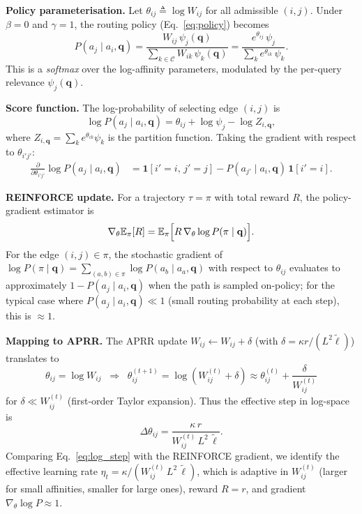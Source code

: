 \documentclass[journal,twocolumn,letterpaper]{IEEEtran}
\newcommand{\APRR}{\textsc{APRR}}
\newcommand{\EE}{\mathbb{E}}
\newcommand{\defeq}{\triangleq}
\begin{document}
\medskip
\noindent\textbf{Policy parameterisation.}
Let $\theta_{ij}\defeq\log W_{ij}$ for all admissible $(i,j)$.
Under $\beta=0$ and $\gamma=1$, the routing policy
(Eq.~\eqref{eq:policy}) becomes
\begin{equation}
  P(a_j\mid a_i,\mathbf{q})
  = \frac{W_{ij}\,\psi_j(\mathbf{q})}
         {\sum_{k\in\mathcal{C}}W_{ik}\,\psi_k(\mathbf{q})}
  = \frac{e^{\theta_{ij}}\,\psi_j}
         {\sum_k e^{\theta_{ik}}\,\psi_k}.
\label{eq:softmax}
\end{equation}
This is a \emph{softmax} over the log-affinity parameters, modulated by the
per-query relevance $\psi_j(\mathbf{q})$.

\medskip
\noindent\textbf{Score function.}
The log-probability of selecting edge $(i,j)$ is
\begin{equation}
  \log P(a_j\mid a_i,\mathbf{q})
  = \theta_{ij} + \log\psi_j - \log Z_{i,\mathbf{q}},
\end{equation}
where $Z_{i,\mathbf{q}}=\sum_k e^{\theta_{ik}}\psi_k$ is the partition
function.  Taking the gradient with respect to $\theta_{i'j'}$:
\begin{align}
  \frac{\partial}{\partial\theta_{i'j'}}
    \log P(a_j\mid a_i,\mathbf{q})
  &= \mathbf{1}[i'=i,\,j'=j] - P(a_{j'}\mid a_i,\mathbf{q})\,\mathbf{1}[i'=i].
\end{align}

\medskip
\noindent\textbf{REINFORCE update.}
For a trajectory $\tau=\pi$ with total reward $R$, the policy-gradient
estimator \cite{williams1992reinforce} is
\begin{equation}
  \nabla_\theta \EE_\pi[R]
  = \EE_\pi\Bigl[R\,\nabla_\theta\log P(\pi\mid\mathbf{q})\Bigr].
\end{equation}
For the edge $(i,j)\in\pi$, the stochastic gradient of
$\log P(\pi\mid\mathbf{q}) = \sum_{(a,b)\in\pi}\log P(a_b\mid a_a,\mathbf{q})$
with respect to $\theta_{ij}$ evaluates to approximately $1-P(a_j\mid a_i,\mathbf{q})$
when the path is sampled on-policy; for the typical case where
$P(a_j\mid a_i,\mathbf{q})\ll 1$ (small routing probability at each step), this
is $\approx 1$.

\medskip
\noindent\textbf{Mapping to \APRR{}.}
The \APRR{} update $W_{ij}\leftarrow W_{ij}+\delta$ (with
$\delta=\kappa r/(L^2\tilde{\ell})$) translates to
\begin{equation}
  \theta_{ij} = \log W_{ij}
  \;\;\Rightarrow\;\;
  \theta_{ij}^{(t+1)} = \log(W_{ij}^{(t)}+\delta)
  \approx \theta_{ij}^{(t)} + \frac{\delta}{W_{ij}^{(t)}}
\end{equation}
for $\delta\ll W_{ij}^{(t)}$ (first-order Taylor expansion).  Thus the
effective step in log-space is
\begin{equation}
  \Delta\theta_{ij} = \frac{\kappa\,r}{W_{ij}^{(t)}\,L^2\,\tilde{\ell}}.
\label{eq:log_step}
\end{equation}
Comparing Eq.~\eqref{eq:log_step} with the REINFORCE gradient, we identify
the effective learning rate
$\eta_t = \kappa/(W_{ij}^{(t)}\,L^2\,\tilde{\ell})$,
which is adaptive in $W_{ij}^{(t)}$ (larger for small affinities, smaller for
large ones), reward $R=r$, and gradient $\nabla_\theta\log P\approx 1$.
\end{document}
